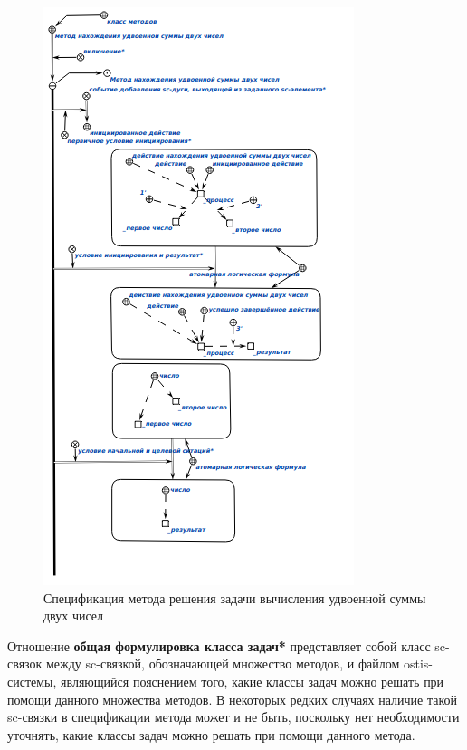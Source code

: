 \begin{figure}[htbp]
  \center
  \includegraphics[width=1.1\linewidth]{figures/condition_and_result.png}
  \caption{Спецификация метода решения задачи вычисления удвоенной суммы двух чисел}
  \label{fig:condition_and_result}
\end{figure}

Отношение \textbf{общая формулировка класса задач*} представляет собой класс sc-связок между sc-связкой, обозначающей множество методов, и файлом ostis-системы, являющийся пояснением того, какие классы задач можно решать при помощи данного множества методов. В некоторых редких случаях наличие такой sc-связки в спецификации метода может и не быть, поскольку нет необходимости уточнять, какие классы задач можно решать при помощи данного метода.

